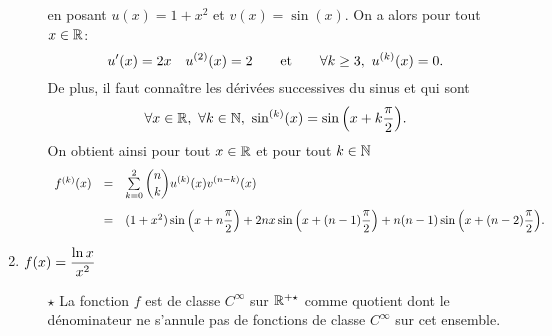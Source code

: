 \documentclass[a4paper, 11pt,reqno]{article}
\begin{document}
\begin{correction}
\begin{enumerate}
\begin{itemize}
			            en posant $u(x)=1+x^2$ et $v(x)=\sin{(x)}$. On a alors pour tout $x\in\mathbb{R}$:
			            $$u^{\prime}(x)=2x\quad u^{(2)}(x)=2\qquad \hbox{et}\qquad \forall k\geq 3,\ u^{(k)}(x)=0.$$
			            De plus, il faut conna\^itre les d\'eriv\'ees successives du sinus et qui sont
			            $$\forall x\in\R,\ \forall k\in\N,\ \sin^{(k)}(x)=\sin{\left( x+k\ddp\frac{\pi}{2} \right)}.$$
			            On obtient ainsi pour tout $x\in\mathbb{R}$ et pour tout $k\in\mathbb{N}$
			            $$\begin{array}{lll}
					            f^{(k)}(x) & = & \sum\limits_{k=0}^2 \ddp \binom{n}{k} u^{(k)}(x)v^{(n-k)}(x)\vsec                                                                                      \\
					                       & = & (1+x^2)\sin{\left( x+n\ddp\frac{\pi}{2} \right)}+2nx\sin{\left( x+(n-1)\ddp\frac{\pi}{2} \right)}+n(n-1)\sin{\left( x+(n-2)\ddp\frac{\pi}{2} \right)}.
				            \end{array}$$
		      \end{itemize}
		\item  $f(x)=\displaystyle\frac{\ln{x}}{x^2}$
		      \begin{itemize}
			      \item[$\star$] La fonction $f$ est de classe $C^{\infty}$ sur $\mathbb{R}^{+\star}$ comme quotient dont le d\'enominateur ne s'annule pas de fonctions de classe $C^{\infty}$ sur cet ensemble.

\end{itemize}
\end{enumerate}
\end{correction}
\end{document}
